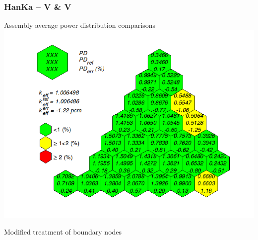 \begin{frame}[t]
  \frametitle{HanKa -- V \& V}
  \vspace*{-.3cm}
  \centering\textcolor{structure.bg!95!blue}{ Assembly average power distribution comparisons}\\[-.3em]
  \includegraphics[scale=.5]{images/HanKa/HCZ2T.png}
  \vspace{-.85cm} 
  \begin{center} Modified treatment of boundary nodes \end{center}
\end{frame}
